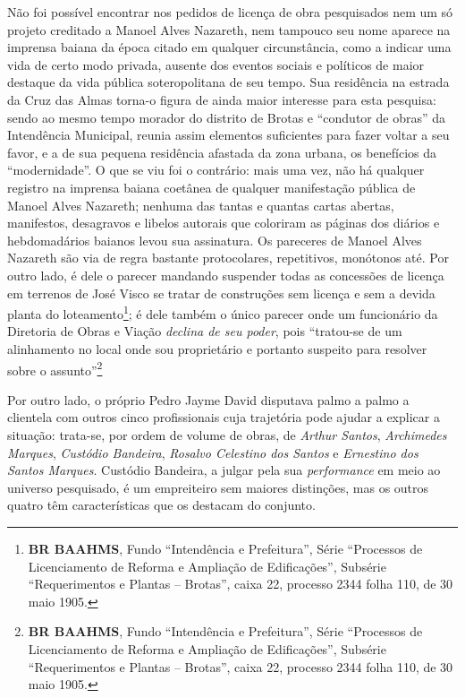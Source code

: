 Não foi possível encontrar nos pedidos de licença de obra pesquisados nem um só projeto creditado a Manoel Alves Nazareth, nem tampouco seu nome aparece na imprensa baiana da época citado em qualquer circunstância, como a indicar uma vida de certo modo privada, ausente dos eventos sociais e políticos de maior destaque da vida pública soteropolitana de seu tempo. Sua residência na estrada da Cruz das Almas torna-o figura de ainda maior interesse para esta pesquisa: sendo ao mesmo tempo morador do distrito de Brotas e ``condutor de obras'' da Intendência Municipal, reunia assim elementos suficientes para fazer voltar a seu favor, e a de sua pequena residência afastada da zona urbana, os benefícios da ``modernidade''. O que se viu foi o contrário: mais uma vez, não há qualquer registro na imprensa baiana coetânea de qualquer manifestação pública de Manoel Alves Nazareth; nenhuma das tantas e quantas cartas abertas, manifestos, desagravos e libelos autorais que coloriram as páginas dos diários e hebdomadários baianos levou sua assinatura. Os pareceres de Manoel Alves Nazareth são via de regra bastante protocolares, repetitivos, monótonos até. Por outro lado, é dele o parecer mandando suspender todas as concessões de licença em terrenos de José Visco se tratar de construções sem licença e sem a devida planta do loteamento\footnote{\textbf{BR BAAHMS}, Fundo ``Intendência e Prefeitura'', Série ``Processos de Licenciamento de Reforma e Ampliação de Edificações'', Subsérie ``Requerimentos e Plantas -- Brotas'', caixa 22, processo 2344 folha 110, de 30 maio 1905.}; é dele também o único parecer onde um funcionário da Diretoria de Obras e Viação \textit{declina de seu poder}, pois ``tratou-se de um alinhamento no local onde sou proprietário e portanto suspeito para resolver sobre o assunto''\footnote{\textbf{BR BAAHMS}, Fundo ``Intendência e Prefeitura'', Série ``Processos de Licenciamento de Reforma e Ampliação de Edificações'', Subsérie ``Requerimentos e Plantas -- Brotas'', caixa 22, processo 2344 folha 110, de 30 maio 1905.}

Por outro lado, o próprio Pedro Jayme David disputava palmo a palmo a clientela com outros cinco profissionais cuja trajetória pode ajudar a explicar a situação: trata-se, por ordem de volume de obras, de \textit{Arthur Santos}, \textit{Archimedes Marques}, \textit{Custódio Bandeira}, \textit{Rosalvo Celestino dos Santos} e \textit{Ernestino dos Santos Marques}. Custódio Bandeira, a julgar pela sua \textit{performance} em meio ao universo pesquisado, é um empreiteiro sem maiores distinções, mas os outros quatro têm características que os destacam do conjunto.

